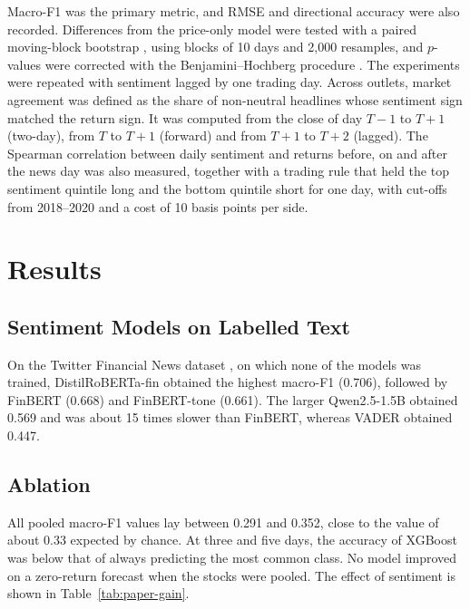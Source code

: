 \documentclass[a4paper,11pt]{article}
\begin{document}
Macro-F1 was the primary metric, and RMSE and directional accuracy were also recorded. Differences from the price-only model were tested with a paired moving-block bootstrap \cite{kunsch1989jackknife}, using blocks of 10 days and 2,000 resamples, and $p$-values were corrected with the Benjamini--Hochberg procedure \cite{benjamini1995controlling}. The experiments were repeated with sentiment lagged by one trading day. Across outlets, market agreement was defined as the share of non-neutral headlines whose sentiment sign matched the return sign. It was computed from the close of day $T-1$ to $T+1$ (two-day), from $T$ to $T+1$ (forward) and from $T+1$ to $T+2$ (lagged). The Spearman correlation between daily sentiment and returns before, on and after the news day was also measured, together with a trading rule that held the top sentiment quintile long and the bottom quintile short for one day, with cut-offs from 2018--2020 and a cost of 10 basis points per side.

\section{Results}
\subsection{Sentiment Models on Labelled Text}
On the Twitter Financial News dataset \cite{zeroshot2022twitter}, on which none of the models was trained, DistilRoBERTa-fin obtained the highest macro-F1 (0.706), followed by FinBERT (0.668) and FinBERT-tone (0.661). The larger Qwen2.5-1.5B obtained 0.569 and was about 15 times slower than FinBERT, whereas VADER obtained 0.447.

\subsection{Ablation}
All pooled macro-F1 values lay between 0.291 and 0.352, close to the value of about 0.33 expected by chance. At three and five days, the accuracy of XGBoost was below that of always predicting the most common class. No model improved on a zero-return forecast when the stocks were pooled. The effect of sentiment is shown in Table~\ref{tab:paper-gain}.
\end{document}
